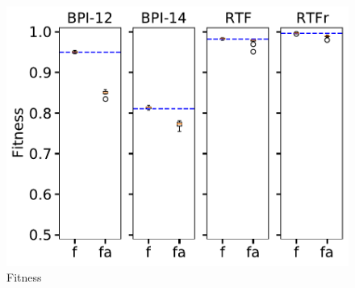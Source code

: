 \documentclass[landscape]{article}
\begin{document}
\begin{figure}[!htb]
\begin{minipage}{0.32\textwidth}
			\includegraphics[width=1.0\textwidth]{../real4_fitness.pdf}
			\caption{Fitness}
	\end{minipage}
	\end{figure}
	
\end{document}
